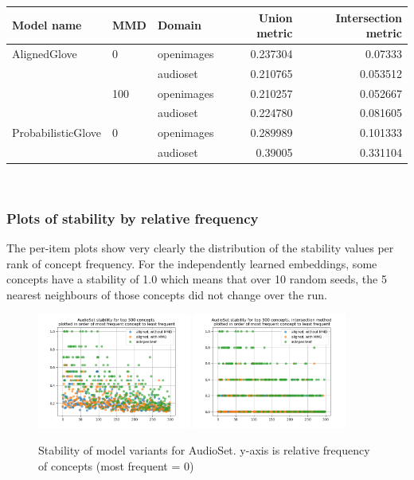\begin{tabular}{lllrr}
\toprule
Model name  & MMD    & Domain          & Union metric & Intersection metric         \\
\midrule
AlignedGlove & 0   & openimages &  0.237304 & 0.07333\\
            &     & audioset &  0.210765 & 0.053512\\
            & 100 & openimages &  0.210257 & 0.052667\\
                   &     & audioset &  0.224780 & 0.081605\\
ProbabilisticGlove & 0   & openimages &  0.289989 & 0.101333 \\
                   &     & audioset &  0.39005 & 0.331104 \\
\bottomrule
\end{tabular}\\

\subsubsection{Plots of stability by relative frequency}

The per-item plots show very clearly the distribution of the stability values per rank of concept frequency. For the independently learned embeddings, some concepts have a stability of 1.0 which means that over 10 random seeds, the 5 nearest neighbours of those concepts did not change over the run. 

\begin{figure}[H]
    \centering
    \includegraphics[width=0.45\textwidth]{images/results/audioset_stability.png}
    \includegraphics[width=0.45\textwidth]{images/results/audioset_stability_ixn.png}
    \caption{
        Stability of model variants for AudioSet. y-axis is relative frequency of concepts (most frequent = 0)
    }
\end{figure}


